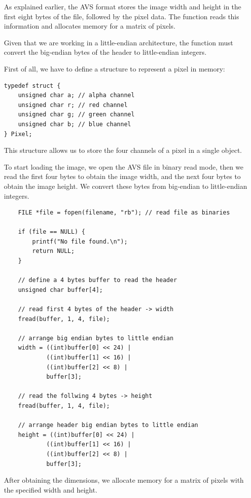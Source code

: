 \documentclass{article}
\begin{document}
As explained earlier, the AVS format stores the image width and height in the first eight bytes of the file, followed by the pixel data. The function reads this information and allocates memory for a matrix of pixels.

Given that we are working in a little-endian architecture, the function must convert the big-endian bytes of the header to little-endian integers.

First of all, we have to define a structure to represent a pixel in memory:

\begin{lstlisting}
typedef struct {
    unsigned char a; // alpha channel
    unsigned char r; // red channel
    unsigned char g; // green channel
    unsigned char b; // blue channel
} Pixel;
\end{lstlisting}

This structure allows us to store the four channels of a pixel in a single object. 

To start loading the image, we open the AVS file in binary read mode, then we read the first four bytes to obtain the image width, and the next four bytes to obtain the image height. We convert these bytes from big-endian to little-endian integers.

\begin{lstlisting}
    FILE *file = fopen(filename, "rb"); // read file as binaries

    if (file == NULL) {
        printf("No file found.\n");
        return NULL;
    }

    // define a 4 bytes buffer to read the header
    unsigned char buffer[4];

    // read first 4 bytes of the header -> width
    fread(buffer, 1, 4, file);

    // arrange big endian bytes to little endian
    width = ((int)buffer[0] << 24) |
            ((int)buffer[1] << 16) |
            ((int)buffer[2] << 8) |
            buffer[3];

    // read the follwing 4 bytes -> height
    fread(buffer, 1, 4, file);

    // arrange header big endian bytes to little endian
    height = ((int)buffer[0] << 24) |
            ((int)buffer[1] << 16) |
            ((int)buffer[2] << 8) |
            buffer[3];
\end{lstlisting}

After obtaining the dimensions, we allocate memory for a matrix of pixels with the specified width and height. 
\end{document}
